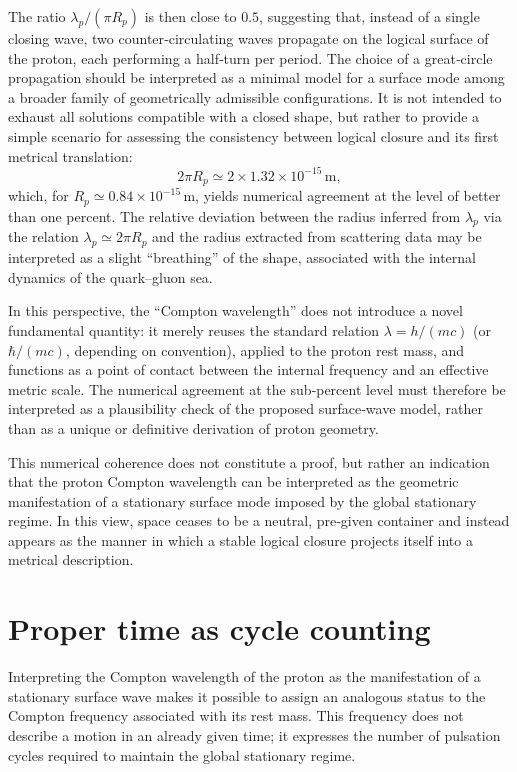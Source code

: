 \documentclass[11pt,a4paper]{article}
\begin{document}
The ratio \(\lambda_p / (\pi R_p)\) is then close to \(0.5\), suggesting that, instead of a single closing wave, two counter‑circulating waves propagate on the logical surface of the proton, each performing a half‑turn per period. The choice of a great‑circle propagation should be interpreted as a minimal model for a surface mode among a broader family of geometrically admissible configurations. It is not intended to exhaust all solutions compatible with a closed shape, but rather to provide a simple scenario for assessing the consistency between logical closure and its first metrical translation:
\[
2\pi R_p \simeq 2 \times 1.32 \times 10^{-15}\,\mathrm{m},
\]
which, for \(R_p \simeq 0.84 \times 10^{-15}\,\mathrm{m}\), yields numerical agreement at the level of better than one percent. The relative deviation between the radius inferred from \(\lambda_p\) via the relation \(\lambda_p \simeq 2\pi R_p\) and the radius extracted from scattering data may be interpreted as a slight “breathing” of the shape, associated with the internal dynamics of the quark–gluon sea.

In this perspective, the “Compton wavelength” does not introduce a novel fundamental quantity: it merely reuses the standard relation \(\lambda = h/(mc)\) (or \(\hbar/(mc)\), depending on convention), applied to the proton rest mass, and functions as a point of contact between the internal frequency and an effective metric scale. The numerical agreement at the sub‑percent level must therefore be interpreted as a plausibility check of the proposed surface‑wave model, rather than as a unique or definitive derivation of proton geometry.

This numerical coherence does not constitute a proof, but rather an indication that the proton Compton wavelength can be interpreted as the geometric manifestation of a stationary surface mode imposed by the global stationary regime. In this view, space ceases to be a neutral, pre‑given container and instead appears as the manner in which a stable logical closure projects itself into a metrical description.

\section{Proper time as cycle counting}

Interpreting the Compton wavelength of the proton as the manifestation of a stationary surface wave makes it possible to assign an analogous status to the Compton frequency associated with its rest mass. This frequency does not describe a motion in an already given time; it expresses the number of pulsation cycles required to maintain the global stationary regime. 
\end{document}

